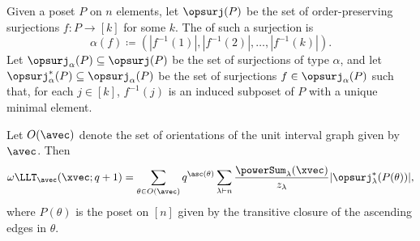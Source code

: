 Given a poset $P$ on $n$ elements, let $\opsurj(P)$ be the set of
order-preserving surjections $f:P\to[k]$ for some $k$.  The
\label{orderPreservingSurjectionType} of such a surjection is
\[
\alpha(f)\coloneqq (|f^{-1}(1)|,|f^{-1}(2)|,\dotsc,|f^{-1}(k)|).
\]
Let $\opsurj_\alpha(P)\subseteq\opsurj(P)$ be the set of surjections of type
$\alpha$, and let $\opsurj^\ast_\alpha(P)\subseteq\opsurj_\alpha(P)$ be the set
of surjections $f\in\opsurj_\alpha(P)$ such that, for each $j\in[k]$,
$f^{-1}(j)$ is an induced subposet of $P$ with a unique minimal element.

\begin{theorem}
Let $O(\avec)$ denote the set of orientations of the unit interval graph given
by $\avec$.  Then
\[
\omega \LLT_{\avec}(\xvec;q+1)
=
\sum_{\theta\in O(\avec)}q^{\asc(\theta)}
\sum_{\lambda\vdash n}
\frac{\powerSum_\lambda(\xvec)}{z_\lambda}
|\opsurj^\ast_\lambda(P(\theta))|,
\]
where $P(\theta)$ is the poset on $[n]$ given by the transitive closure of the
ascending edges in $\theta$.
\end{theorem}

